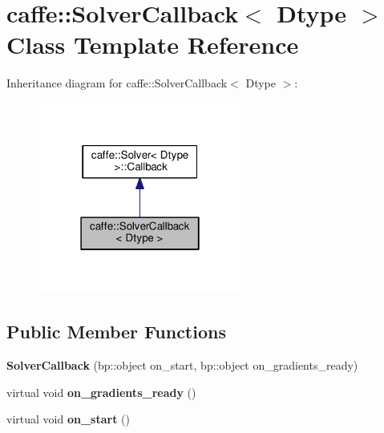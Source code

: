 \hypertarget{classcaffe_1_1_solver_callback}{}\section{caffe\+:\+:Solver\+Callback$<$ Dtype $>$ Class Template Reference}
\label{classcaffe_1_1_solver_callback}


Inheritance diagram for caffe\+:\+:Solver\+Callback$<$ Dtype $>$\+:
\nopagebreak
\begin{figure}[H]
\begin{center}
\leavevmode
\includegraphics[width=190pt]{classcaffe_1_1_solver_callback__inherit__graph}
\end{center}
\end{figure}
\subsection*{Public Member Functions}
\begin{DoxyCompactItemize}
\item 
\mbox{\label{classcaffe_1_1_solver_callback_ad3eee5621a9eb15b8518a6b768109e6e}} 
{\bfseries Solver\+Callback} (bp\+::object on\+\_\+start, bp\+::object on\+\_\+gradients\+\_\+ready)
\item 
\mbox{\label{classcaffe_1_1_solver_callback_a9a6596f3e3858430a7a6fdbeade4add9}} 
virtual void {\bfseries on\+\_\+gradients\+\_\+ready} ()
\item 
\mbox{\label{classcaffe_1_1_solver_callback_a2df9c60aa80adb89842e6d5f69a3c2e7}} 
virtual void {\bfseries on\+\_\+start} ()
\end{DoxyCompactItemize}
